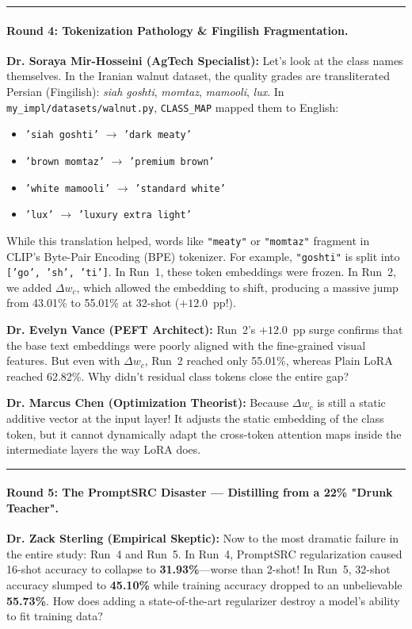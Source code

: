 \documentclass[letterpaper,11pt,leqno]{article}
\newcommand{\speakerVance}[1]{\noindent\textbf{\color{purple!80!black}Dr. Evelyn Vance (PEFT Architect):} #1\vspace{0.4em}}
\newcommand{\speakerMirHosseini}[1]{\noindent\textbf{\color{orange!80!black}Dr. Soraya Mir-Hosseini (AgTech Specialist):} #1\vspace{0.4em}}
\newcommand{\speakerChen}[1]{\noindent\textbf{\color{green!60!black}Dr. Marcus Chen (Optimization Theorist):} #1\vspace{0.4em}}
\newcommand{\speakerSterling}[1]{\noindent\textbf{\color{red!75!black}Dr. Zack Sterling (Empirical Skeptic):} #1\vspace{0.4em}}
\begin{document}
\vspace{0.8em}\hrule\vspace{0.8em}

\paragraph{Round 4: Tokenization Pathology \& Fingilish Fragmentation.}
\speakerMirHosseini{Let's look at the class names themselves. In the Iranian walnut dataset, the quality grades are transliterated Persian (Fingilish): \textit{siah goshti}, \textit{momtaz}, \textit{mamooli}, \textit{lux}. In \texttt{my\_impl/datasets/walnut.py}, \texttt{CLASS\_MAP} mapped them to English:
\begin{itemize}
    \item \texttt{'siah goshti'} $\to$ \texttt{'dark meaty'}
    \item \texttt{'brown momtaz'} $\to$ \texttt{'premium brown'}
    \item \texttt{'white mamooli'} $\to$ \texttt{'standard white'}
    \item \texttt{'lux'} $\to$ \texttt{'luxury extra light'}
\end{itemize}
While this translation helped, words like \texttt{"meaty"} or \texttt{"momtaz"} fragment in CLIP's Byte-Pair Encoding (BPE) tokenizer. For example, \texttt{"goshti"} is split into \texttt{['go', 'sh', 'ti']}. In Run~1, these token embeddings were frozen. In Run~2, we added $\Delta w_c$, which allowed the embedding to shift, producing a massive jump from 43.01\% to 55.01\% at 32-shot ($+12.0$~pp!).}

\speakerVance{Run~2's $+12.0$~pp surge confirms that the base text embeddings were poorly aligned with the fine-grained visual features. But even with $\Delta w_c$, Run~2 reached only 55.01\%, whereas Plain LoRA reached 62.82\%. Why didn't residual class tokens close the entire gap?}

\speakerChen{Because $\Delta w_c$ is still a static additive vector at the input layer! It adjusts the static embedding of the class token, but it cannot dynamically adapt the cross-token attention maps inside the intermediate layers the way LoRA does.}

\vspace{0.8em}\hrule\vspace{0.8em}

\paragraph{Round 5: The PromptSRC Disaster — Distilling from a 22\% "Drunk Teacher".}
\speakerSterling{Now to the most dramatic failure in the entire study: Run~4 and Run~5. In Run~4, PromptSRC regularization caused 16-shot accuracy to collapse to \textbf{31.93\%}---worse than 2-shot! In Run~5, 32-shot accuracy slumped to \textbf{45.10\%} while training accuracy dropped to an unbelievable \textbf{55.73\%}. How does adding a state-of-the-art regularizer destroy a model's ability to fit training data?}
\end{document}
